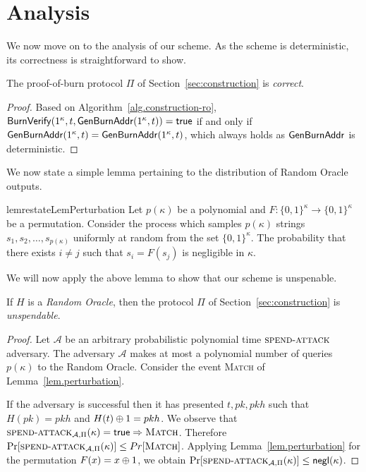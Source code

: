\section{Analysis}

We now move on to the analysis of our scheme. As the scheme is deterministic,
its correctness is straightforward to show.

\begin{theorem}[Correctness]
  The proof-of-burn protocol $\Pi$ of Section~\ref{sec:construction} is \emph{correct}.
\end{theorem}
\begin{proof}
  Based on Algorithm~\ref{alg.construction-ro}, $\mathsf{BurnVerify}(1^\kappa, t, \mathsf{Gen}\-\mathsf{Burn}\-\mathsf{Addr}(1^\kappa, t)) = \textsf{true}$ if and only if $\mathsf{Gen}\-\mathsf{Burn}\-\mathsf{Addr}(1^\kappa, t) = \mathsf{Gen}\-\mathsf{Burn}\-\mathsf{Addr}(1^\kappa, t)$, which always holds as $\mathsf{Gen}\-\mathsf{Burn}\-\mathsf{Addr}$ is deterministic.
\end{proof}

We now state a simple lemma pertaining to the distribution of Random Oracle
outputs.

\begin{restatable}[Perturbation]{lem}{restateLemPerturbation}
  \label{lem.perturbation}
  Let $p(\kappa)$ be a polynomial and
  $F: \{0,1\}^\kappa \longrightarrow \{0,1\}^\kappa$ be a permutation.
  Consider the process which samples $p(\kappa)$ strings $s_1, s_2, \dots, s_{p(\kappa)}$ uniformly at random from the set $\{0, 1\}^\kappa$. The probability that there exists $i \neq j$ such that $s_i = F(s_j)$ is negligible in $\kappa$.
\end{restatable}

We will now apply the above lemma to show that our scheme is unspenable.

\begin{theorem}[Unspendability]
  If $H$ is a \emph{Random Oracle}, then the protocol $\Pi$ of Section~\ref{sec:construction} is \emph{unspendable}.
\end{theorem}
\begin{proof}
  Let $\mathcal{A}$ be an arbitrary probabilistic polynomial time $\textsc{spend}\-\text{-}\-\textsc{attack}$ adversary.
  The adversary $\mathcal{A}$ makes at most a polynomial number of queries $p(\kappa)$ to the Random Oracle.
  Consider the event \textsc{Match} of Lemma~\ref{lem.perturbation}.

  If the adversary is successful then it has presented $t, pk, pkh$ such that $H(pk) = pkh$ and $H(t) \oplus 1 = pkh$.
  We observe that $\textsc{spend}\-\text{-}\-\textsc{attack}_{\mathcal{A}, \Pi}(\kappa) = \mathsf{true} \Rightarrow \textsc{Match}$.
  Therefore $\Pr[\textsc{spend}\-\text{-}\-\textsc{attack}_{\mathcal{A}, \Pi}(\kappa)] \leq Pr[\textsc{Match}]$. Applying Lemma~\ref{lem.perturbation} for the permutation $F(x) = x \oplus 1$,
  we obtain
  $\Pr[\textsc{spend}\-\text{-}\-\textsc{attack}_{\mathcal{A}, \Pi}(\kappa)] \leq \textsf{negl}(\kappa)$.
\end{proof}

